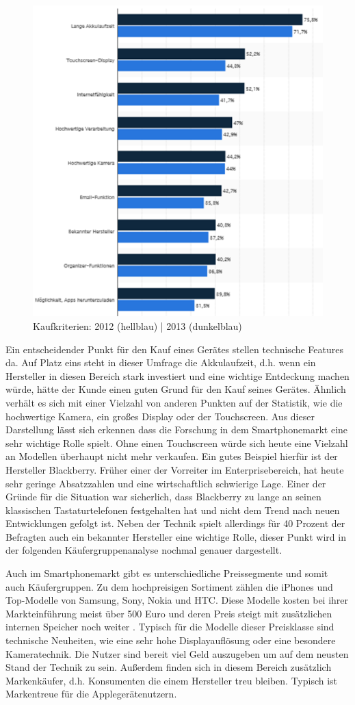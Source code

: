 \begin{figure}[H]
\centering
\includegraphics[width=0.7\linewidth]{../images/statista2.png}
\caption{Kaufkriterien: 2012 (hellblau) | 2013 (dunkelblau)}
\label{fig:stat2}
\end{figure}


Ein entscheidender Punkt für den Kauf eines Gerätes stellen technische Features da. Auf Platz eins steht in dieser Umfrage die Akkulaufzeit, d.h. wenn ein Hersteller in diesen Bereich stark investiert und eine wichtige Entdeckung machen würde, hätte der Kunde einen guten Grund für den Kauf seines Gerätes. Ähnlich verhält es sich mit einer Vielzahl von anderen Punkten auf der Statistik, wie die hochwertige Kamera, ein großes Display oder der Touchscreen. Aus dieser Darstellung lässt sich erkennen dass die Forschung in dem Smartphonemarkt eine sehr wichtige Rolle spielt. Ohne einen Touchscreen würde sich heute eine Vielzahl an Modellen überhaupt nicht mehr verkaufen. Ein gutes Beispiel hierfür ist der Hersteller Blackberry. Früher einer der Vorreiter im Enterprisebereich, hat heute sehr geringe Absatzzahlen und eine wirtschaftlich schwierige Lage. Einer der Gründe für die Situation war sicherlich, dass Blackberry zu lange an seinen klassischen Tastaturtelefonen festgehalten hat und nicht dem Trend nach neuen Entwicklungen gefolgt ist. Neben der Technik  spielt allerdings für 40 Prozent der Befragten auch ein bekannter Hersteller eine wichtige Rolle, dieser Punkt wird in der folgenden Käufergruppenanalyse nochmal genauer dargestellt.

Auch im Smartphonemarkt gibt es unterschiedliche Preissegmente und somit auch Käufergruppen. Zu dem hochpreisigen Sortiment zählen die iPhones und Top-Modelle von Samsung, Sony, Nokia und HTC. Diese Modelle kosten bei ihrer Markteinführung meist über 500 Euro und deren Preis steigt mit zusätzlichen internen Speicher noch weiter . Typisch für die Modelle dieser Preisklasse sind technische Neuheiten, wie eine sehr hohe Displayauflösung oder eine besondere Kameratechnik. Die Nutzer sind bereit viel Geld auszugeben um auf dem neusten Stand der Technik zu sein. Außerdem finden sich in diesem Bereich zusätzlich Markenkäufer, d.h. Konsumenten die einem Hersteller treu bleiben. Typisch ist Markentreue für die Applegerätenutzern. 

